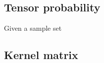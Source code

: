 \documentclass[letterpaper,12pt]{article}
\begin{document}
\subsection{Tensor probability}

Given a sample set


\subsection{Kernel matrix}





% 
% 
% 
% 
% 
% 
% 
% 
% 
% 
% 
\end{document}

